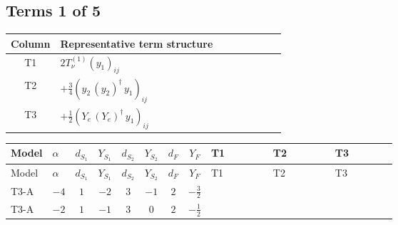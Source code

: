 \documentclass[8pt]{article}
\begin{document}
\begin{landscape}
\subsection*{Terms 1 of 5}
\begin{center}
\begin{tabular}{@{}c >{\raggedright\arraybackslash}p{0.82\linewidth}@{}}
\toprule
Column & Representative term structure \\
\midrule
T1 & \(\displaystyle 2 T_{\nu}^{(1)} \left({y_1}\right)_{ij}\) \\
\midrule
T2 & \(\displaystyle +\frac{3}{4} \left({y_2}\,\left({y_2}\right)^{\dagger}\,{y_1}\right)_{ij}\) \\
\midrule
T3 & \(\displaystyle +\frac{1}{2} \left({Y_e}\,\left({Y_e}\right)^{\dagger}\,{y_1}\right)_{ij}\) \\
\midrule
\bottomrule
\end{tabular}
\end{center}
\smallskip
\tiny
\begin{longtable}{@{}llcccccc >{\raggedright\arraybackslash}p{0.21\linewidth} >{\raggedright\arraybackslash}p{0.21\linewidth} >{\raggedright\arraybackslash}p{0.21\linewidth}@{}}
\toprule
Model & $\alpha$ & $d_{S_1}$ & $Y_{S_1}$ & $d_{S_2}$ & $Y_{S_2}$ & $d_F$ & $Y_F$ & T1 & T2 & T3 \\
\midrule
\endfirsthead
\toprule
Model & $\alpha$ & $d_{S_1}$ & $Y_{S_1}$ & $d_{S_2}$ & $Y_{S_2}$ & $d_F$ & $Y_F$ & T1 & T2 & T3 \\
\midrule
\endhead
T3-A & $-4$ & $1$ & $-2$ & $3$ & $-1$ & $2$ & $-\frac{3}{2}$ & \scriptsize\adjustbox{max width=\linewidth}{$\begin{gathered} 2 T_{\nu}^{(1)} \left({y_1}\right)_{ij}\end{gathered}$} & \scriptsize\adjustbox{max width=\linewidth}{$\begin{gathered} +\frac{3}{4} \left({y_2}\,\left({y_2}\right)^{\dagger}\,{y_1}\right)_{ij}\end{gathered}$} & \scriptsize\adjustbox{max width=\linewidth}{$\begin{gathered} +\frac{1}{2} \left({Y_e}\,\left({Y_e}\right)^{\dagger}\,{y_1}\right)_{ij}\end{gathered}$} \\
\midrule
T3-A & $-2$ & $1$ & $-1$ & $3$ & $0$ & $2$ & $-\frac{1}{2}$ & \scriptsize\adjustbox{max width=\linewidth}{$\begin{gathered} 2 T_{\nu}^{(1)} \left({y_1}\right)_{ij}\end{gathered}$} & \scriptsize\adjustbox{max width=\linewidth}{$\begin{gathered} +\frac{3}{4} \left({y_2}\,\left({y_2}\right)^{\dagger}\,{y_1}\right)_{ij}\end{gathered}$} & \scriptsize\adjustbox{max width=\linewidth}{$\begin{gathered} +\frac{1}{2} \left({Y_e}\,\left({Y_e}\right)^{\dagger}\,{y_1}\right)_{ij}\end{gathered}$} \\

\end{longtable}
\end{landscape}
\end{document}
